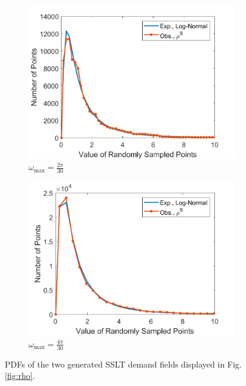 \documentclass[12pt,dvipsnames]{report}
\begin{document}
\begin{figure}[!ht]
\centering
\begin{subfigure}{.45\textwidth}
	\centering
	\includegraphics[width=1\linewidth]{rho_pdf_O2pi-300_L100000_X100_Y100}
	\caption{\small $\omega_{\max}=\frac{2\pi}{30}$}
	\label{fig:rho_pdf_2pi-300}
\end{subfigure}
\hspace{0.5cm}
\begin{subfigure}{.45\textwidth}
	\centering
	\includegraphics[width=1\linewidth]{rho_pdf_O4pi-300_L100000_X100_Y100}
	\caption{\small $\omega_{\max}=\frac{4\pi}{30}$}
	\label{fig:rho_pdf_4pi-300}
\end{subfigure}
\caption[PDF comparisons of example SSLT demand fields to the log-normal distribution]{\small PDFs of the two generated SSLT demand fields displayed in Fig. \ref{fig:rho}.}
\label{fig:rho_pdf}
\end{figure}
\end{document}
